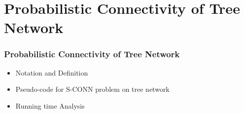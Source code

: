 \documentclass{beamer}
\newcommand{\SCONN}   { {\mathrm {S\mbox{-}CONN}} }
\newcommand{\SRCONN}   { {\mathrm {SR\mbox{-}CONN}} }
\begin{document}
\section{Probabilistic Connectivity of Tree Network}
\begin{frame}
\frametitle{Probabilistic Connectivity of Tree Network}
\begin{itemize}
\item Notation and Definition
\item Pseudo-code for $\SCONN$ problem on tree network
\item Running time Analysis
\end{itemize}
\end{frame}
\end{document}
